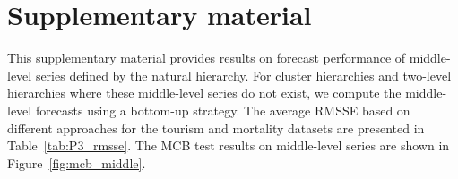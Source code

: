 \documentclass[12pt]{article}
\begin{document}
\section*{Supplementary material}

This supplementary material provides results on forecast performance of middle-level series defined by the natural hierarchy. For cluster hierarchies and two-level hierarchies where these middle-level series do not exist, we compute the middle-level forecasts using a bottom-up strategy. The average RMSSE based on different approaches for the tourism and mortality datasets are presented in Table~\ref{tab:P3_rmsse}. The MCB test results on middle-level series are shown in Figure~\ref{fig:mcb_middle}.\\
\end{document}
